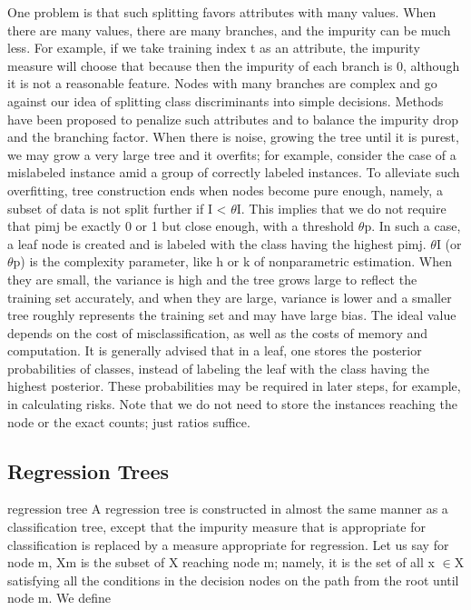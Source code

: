 One problem is that such splitting favors attributes with many values. When there are many values, there are many branches, and the impurity can be much less. For example, if we take training index t as an attribute, the impurity measure will choose that because then the impurity of each branch is 0, although it is not a reasonable feature. Nodes with many branches are complex and go against our idea of splitting class discriminants into simple decisions. Methods have been proposed to penalize such attributes and to balance the impurity drop and the branching factor. When there is noise, growing the tree until it is purest, we may grow a very large tree and it overfits; for example, consider the case of a mislabeled instance amid a group of correctly labeled instances. To alleviate such overfitting, tree construction ends when nodes become pure enough, namely, a subset of data is not split further if I < $\theta$I. This implies that we do not require that pimj be exactly 0 or 1 but close enough, with a threshold $\theta$p. In such a case, a leaf node is created and is labeled with the class having the highest pimj. $\theta$I (or $\theta$p) is the complexity parameter, like h or k of nonparametric estimation. When they are small, the variance is high and the tree grows large to reflect the training set accurately, and when they are large, variance is lower and a smaller tree roughly represents the training set and may have large bias. The ideal value depends on the cost of misclassification, as well as the costs of memory and computation. It is generally advised that in a leaf, one stores the posterior probabilities of classes, instead of labeling the leaf with the class having the highest posterior. These probabilities may be required in later steps, for example, in calculating risks. Note that we do not need to store the instances reaching the node or the exact counts; just ratios suffice.

\subsection{Regression Trees}

regression tree A regression tree is constructed in almost the same manner as a classification tree, except that the impurity measure that is appropriate for classification is replaced by a measure appropriate for regression. Let us say for node m, Xm is the subset of X reaching node m; namely, it is the set of all x $\in$X satisfying all the conditions in the decision nodes on the path from the root until node m. We define

